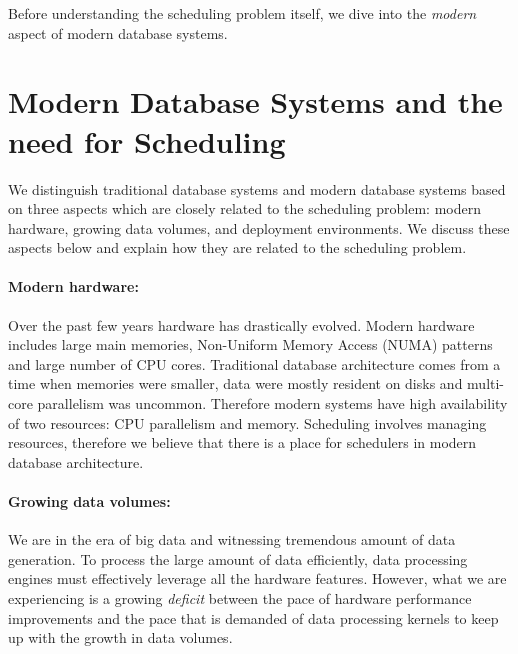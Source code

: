 Before understanding the scheduling problem itself, we dive into the \textit{modern} aspect of modern database systems.

\section{Modern Database Systems and the need for Scheduling}
We distinguish traditional database systems and modern database systems based on three aspects which are closely related to the scheduling problem: modern hardware, growing data volumes, and deployment environments.
We discuss these aspects below and explain how they are related to the scheduling problem. 
\paragraph{Modern hardware:} 
Over the past few years hardware has drastically evolved. 
Modern hardware includes large main memories, Non-Uniform Memory Access (NUMA) patterns and large number of CPU cores.
Traditional database architecture comes from a time when memories were smaller, data were mostly resident on disks and multi-core parallelism was uncommon. 
Therefore modern systems have high availability of two resources: CPU parallelism and memory.
Scheduling involves managing resources, therefore we believe that there is a place for schedulers in modern database architecture. 
\paragraph{Growing data volumes:}
We are in the era of big data and witnessing tremendous amount of data generation.
To process the large amount of data efficiently, data processing engines must effectively leverage all the hardware features. 
However, what we are experiencing is a growing \textit{deficit} between the pace of hardware performance improvements and the pace that is demanded of data processing kernels to keep up with the growth in data volumes.

